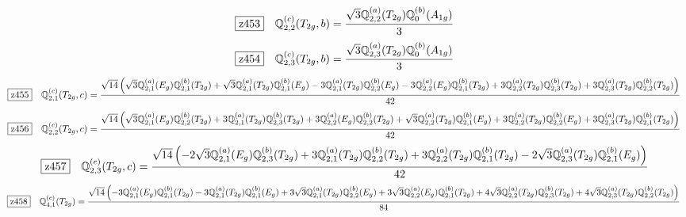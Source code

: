 \documentclass[fleqn,10pt,landscape]{jsarticle}
\begin{document}
\begin{dmath*}
\hspace*{3mm}\fbox{z453}\quad \mathbb{Q}_{2,2}^{(c)}(T_{2g},b)=\frac{\sqrt{3} \mathbb{Q}_{2,2}^{(a)}(T_{2g}) \mathbb{Q}_{0}^{(b)}(A_{1g})}{3}
\end{dmath*}
\begin{dmath*}
\hspace*{3mm}\fbox{z454}\quad \mathbb{Q}_{2,3}^{(c)}(T_{2g},b)=\frac{\sqrt{3} \mathbb{Q}_{2,3}^{(a)}(T_{2g}) \mathbb{Q}_{0}^{(b)}(A_{1g})}{3}
\end{dmath*}
\begin{dmath*}
\hspace*{3mm}\fbox{z455}\quad \mathbb{Q}_{2,1}^{(c)}(T_{2g},c)=\frac{\sqrt{14} \left(\sqrt{3} \mathbb{Q}_{2,1}^{(a)}(E_{g}) \mathbb{Q}_{2,1}^{(b)}(T_{2g}) + \sqrt{3} \mathbb{Q}_{2,1}^{(a)}(T_{2g}) \mathbb{Q}_{2,1}^{(b)}(E_{g}) - 3 \mathbb{Q}_{2,1}^{(a)}(T_{2g}) \mathbb{Q}_{2,2}^{(b)}(E_{g}) - 3 \mathbb{Q}_{2,2}^{(a)}(E_{g}) \mathbb{Q}_{2,1}^{(b)}(T_{2g}) + 3 \mathbb{Q}_{2,2}^{(a)}(T_{2g}) \mathbb{Q}_{2,3}^{(b)}(T_{2g}) + 3 \mathbb{Q}_{2,3}^{(a)}(T_{2g}) \mathbb{Q}_{2,2}^{(b)}(T_{2g})\right)}{42}
\end{dmath*}
\begin{dmath*}
\hspace*{3mm}\fbox{z456}\quad \mathbb{Q}_{2,2}^{(c)}(T_{2g},c)=\frac{\sqrt{14} \left(\sqrt{3} \mathbb{Q}_{2,1}^{(a)}(E_{g}) \mathbb{Q}_{2,2}^{(b)}(T_{2g}) + 3 \mathbb{Q}_{2,1}^{(a)}(T_{2g}) \mathbb{Q}_{2,3}^{(b)}(T_{2g}) + 3 \mathbb{Q}_{2,2}^{(a)}(E_{g}) \mathbb{Q}_{2,2}^{(b)}(T_{2g}) + \sqrt{3} \mathbb{Q}_{2,2}^{(a)}(T_{2g}) \mathbb{Q}_{2,1}^{(b)}(E_{g}) + 3 \mathbb{Q}_{2,2}^{(a)}(T_{2g}) \mathbb{Q}_{2,2}^{(b)}(E_{g}) + 3 \mathbb{Q}_{2,3}^{(a)}(T_{2g}) \mathbb{Q}_{2,1}^{(b)}(T_{2g})\right)}{42}
\end{dmath*}
\begin{dmath*}
\hspace*{3mm}\fbox{z457}\quad \mathbb{Q}_{2,3}^{(c)}(T_{2g},c)=\frac{\sqrt{14} \left(- 2 \sqrt{3} \mathbb{Q}_{2,1}^{(a)}(E_{g}) \mathbb{Q}_{2,3}^{(b)}(T_{2g}) + 3 \mathbb{Q}_{2,1}^{(a)}(T_{2g}) \mathbb{Q}_{2,2}^{(b)}(T_{2g}) + 3 \mathbb{Q}_{2,2}^{(a)}(T_{2g}) \mathbb{Q}_{2,1}^{(b)}(T_{2g}) - 2 \sqrt{3} \mathbb{Q}_{2,3}^{(a)}(T_{2g}) \mathbb{Q}_{2,1}^{(b)}(E_{g})\right)}{42}
\end{dmath*}
\begin{dmath*}
\hspace*{3mm}\fbox{z458}\quad \mathbb{Q}_{4,1}^{(c)}(T_{2g})=\frac{\sqrt{14} \left(- 3 \mathbb{Q}_{2,1}^{(a)}(E_{g}) \mathbb{Q}_{2,1}^{(b)}(T_{2g}) - 3 \mathbb{Q}_{2,1}^{(a)}(T_{2g}) \mathbb{Q}_{2,1}^{(b)}(E_{g}) + 3 \sqrt{3} \mathbb{Q}_{2,1}^{(a)}(T_{2g}) \mathbb{Q}_{2,2}^{(b)}(E_{g}) + 3 \sqrt{3} \mathbb{Q}_{2,2}^{(a)}(E_{g}) \mathbb{Q}_{2,1}^{(b)}(T_{2g}) + 4 \sqrt{3} \mathbb{Q}_{2,2}^{(a)}(T_{2g}) \mathbb{Q}_{2,3}^{(b)}(T_{2g}) + 4 \sqrt{3} \mathbb{Q}_{2,3}^{(a)}(T_{2g}) \mathbb{Q}_{2,2}^{(b)}(T_{2g})\right)}{84}
\end{dmath*}
\end{document}

